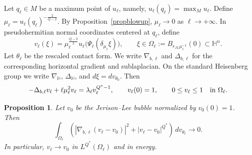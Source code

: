 \documentclass[11pt]{article}
\numberwithin{equation}{section}
\newtheorem{proposition}{Proposition}[section]
\numberwithin{equation}{section}
\begin{document}
	Let \(q_\ell\in M\) be a maximum point of \(u_\ell\), namely, \(u_\ell(q_\ell)=\max_Mu_\ell\). Define \( \mu_\ell=u_\ell(q_\ell)^{-\frac{2}{Q-2}} . \) By Proposition~\ref{propblowup}, \(\mu_\ell\to0\) as \(\ell \to +\infty\). In pseudohermitian normal coordinates centered at \(q_\ell\), define
	\[
	v_\ell(\xi) = \mu_\ell^{\frac{Q-2}{2}} u_\ell\bigl(\Psi_\ell(\delta_{\mu_\ell}\xi)\bigr), \qquad \xi\in\Omega_\ell:=B_{r_{JL}\mu_\ell^{-1}}(0)\subset\mathbb H^n .
	\]
	Let \(\theta_\ell\) be the rescaled contact form. We write \(\nabla_{b,\ell}\) and \(\Delta_{b,\ell}\) for the corresponding horizontal gradient and sublaplacian. On the standard Heisenberg group we write \(\nabla_{\mathbb H}\), \(\Delta_{\mathbb H}\), and \(d\xi=dv_{\theta_0}\). Then
	\begin{equation}\label{eqnvell}
		-\Delta_{b,\ell}v_\ell+\ell\mu_\ell^2v_\ell = \lambda_\ell v_\ell^{Q^*-1}, \qquad v_\ell(0)=1,\qquad 0\le v_\ell\le1 \quad\hbox{in }\Omega_\ell .
	\end{equation}
	
	\begin{proposition}\label{propvstrong}
		Let \(v_0\) be the Jerison--Lee bubble normalized by \(v_0(0)=1\). Then
		\begin{equation}\label{equvstrong}
			\int_{\Omega_\ell} ( |\nabla_{b,\ell}(v_\ell-v_0)|^2 + |v_\ell-v_0|^{Q^*} ) \,dv_{\theta_\ell} \longrightarrow0 .
		\end{equation}
		In particular, \(v_\ell\to v_0\) in \(L^{Q^*}(\Omega_\ell)\) and in energy.
	\end{proposition}
	
\end{document}
